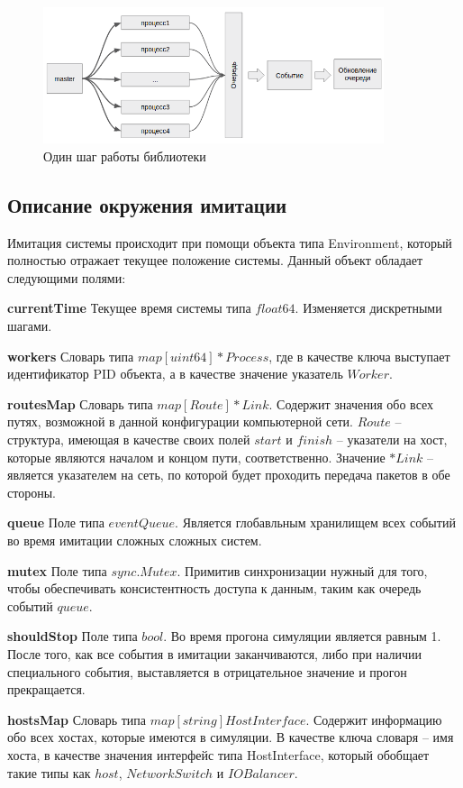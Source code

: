 \begin{figure}[!ht]
\centering
\includegraphics[width=10cm]{Kenenbek/images/libstep.png}
\caption{Один шаг работы библиотеки}
\label{fig:libstep}
\end{figure}

\subsection{Описание окружения имитации}

Имитация системы происходит при помощи объекта типа Environment, который полностью отражает текущее положение системы. Данный объект обладает следующими полями:

\textbf{currentTime}
Текущее время системы типа $float64$. Изменяется дискретными шагами.

\textbf{workers}
Словарь типа $map[uint64]*Process$, где в качестве ключа выступает идентификатор PID объекта, а в качестве значение указатель $Worker$.

\textbf{routesMap}  
Словарь типа  $map[Route]*Link$. Содержит значения обо всех путях, возможной в данной конфигурации компьютерной сети. $Route$ -- структура, имеющая в качестве своих полей $start$ и $finish$ -- указатели на хост, которые являются началом и концом пути, соответственно. Значение $*Link$ -- является указателем на сеть, по которой будет проходить передача пакетов в обе стороны.


\textbf{queue}
Поле типа $eventQueue$. Является глобавльным хранилищем всех событий во время имитации сложных сложных систем.

\textbf{mutex}         
Поле типа $sync.Mutex$. Примитив синхронизации нужный для того, чтобы обеспечивать консистентность доступа к данным, таким как очередь событий $queue$. 

\textbf{shouldStop}    
Поле типа $bool$. Во время прогона симуляции является равным 1. После того, как все события в имитации заканчиваются, либо при наличии специального события, выставляется в отрицательное значение и прогон прекращается.

\textbf{hostsMap}      
Словарь типа $map[string]HostInterface$. Содержит информацию обо всех хостах, которые имеются в симуляции. В качестве ключа словаря -- имя хоста, в качестве значения интерфейс типа HostInterface, который обобщает такие типы как $host$, $NetworkSwitch$ и $IOBalancer$.

